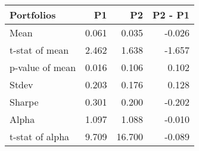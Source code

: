 \begin{tabular}{lrrr}
\toprule
Portfolios & P1 & P2 & P2 - P1 \\
\midrule
Mean & 0.061 & 0.035 & -0.026 \\
t-stat of mean & 2.462 & 1.638 & -1.657 \\
p-value of mean & 0.016 & 0.106 & 0.102 \\
Stdev & 0.203 & 0.176 & 0.128 \\
Sharpe & 0.301 & 0.200 & -0.202 \\
Alpha & 1.097 & 1.088 & -0.010 \\
t-stat of alpha & 9.709 & 16.700 & -0.089 \\
\bottomrule
\end{tabular}
